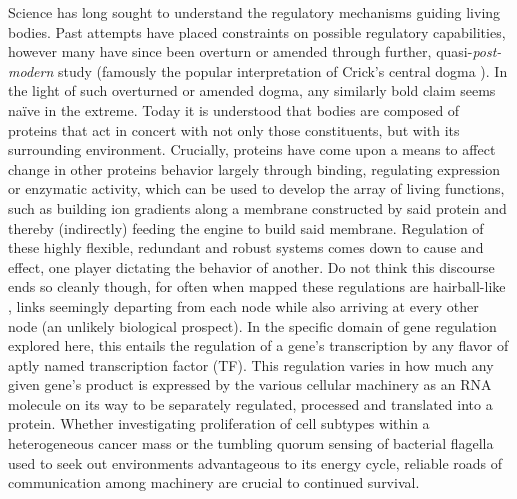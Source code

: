 Science has long sought to understand the regulatory mechanisms guiding living bodies. Past attempts have placed constraints on possible regulatory capabilities, however many have since been overturn or amended through further, quasi-\emph{post-modern} study (famously the popular interpretation of Crick's central dogma \cite{crick1958protein}). In the light of such overturned or amended dogma, any similarly bold claim seems na\"{i}ve in the extreme. Today it is understood that bodies are composed of proteins that act in concert with not only those constituents, but with its surrounding environment. Crucially, proteins have come upon a means to affect change in other proteins behavior largely through binding, \eg regulating expression or enzymatic activity, which can be used to develop the array of living functions, such as building ion gradients along a membrane constructed by said protein and thereby (indirectly) feeding the engine to build said membrane. Regulation of these highly flexible, redundant and robust systems comes down to cause and effect, \ie one player dictating the behavior of another. Do not think this discourse ends so cleanly though, for often when mapped these regulations are hairball-like \cite{schulz2013grooming}, links seemingly departing from each node while also arriving at every other node (an unlikely biological prospect). In the specific domain of gene regulation explored here, this entails the regulation of a gene's transcription by any flavor of aptly named transcription factor (TF). This regulation varies in how much any given gene's product is expressed by the various cellular machinery as an RNA molecule on its way to be separately regulated, processed and translated into a protein. Whether investigating proliferation of cell subtypes within a heterogeneous cancer mass or the tumbling quorum sensing of bacterial flagella used to seek out environments advantageous to its energy cycle, reliable roads of communication among machinery are crucial to continued survival.

